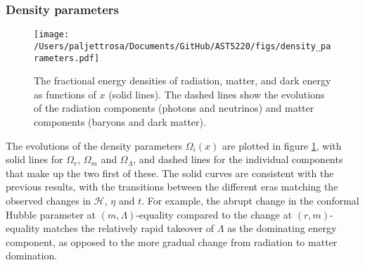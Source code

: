 \documentclass{aa}
\numberwithin{equation}{section}
\numberwithin{table}{section}
\numberwithin{figure}{section}
\begin{document}
\subsubsection{Density parameters}
\begin{figure}
    \centering
    \texttt{[image: /Users/paljettrosa/Documents/GitHub/AST5220/figs/density\_parameters.pdf]}
    \caption{The fractional energy densities of radiation, matter, and dark energy as functions of $x$ (solid lines). The dashed lines show the evolutions of the radiation components (photons and neutrinos) and matter components (baryons and dark matter).}\label{fig:density parameters}
\end{figure}

The evolutions of the density parameters $\Omega_i(x)$ are plotted in figure \ref{fig:density parameters}, with solid lines for $\Omega_r$, $\Omega_m$ and $\Omega_\Lambda$, and dashed lines for the individual components that make up the two first of these. The solid curves are consistent with the previous results, with the transitions between the different eras matching the observed changes in $\mathcal{H}$, $\eta$ and $t$. For example, the abrupt change in the conformal Hubble parameter at $(m,\Lambda)$-equality compared to the change at $(r,m)$-equality matches the relatively rapid takeover of $\Lambda$ as the dominating energy component, as opposed to the more gradual change from radiation to matter domination. 
\end{document}
